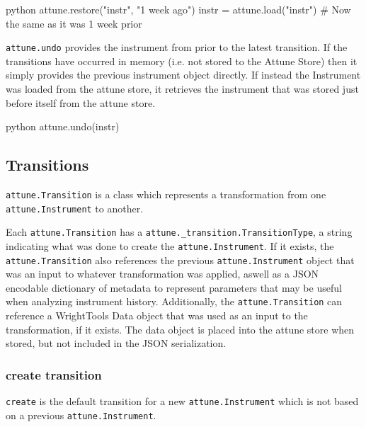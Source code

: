 \begin{codefragment}{python}
attune.restore("instr", "1 week ago")
instr = attune.load("instr")  # Now the same as it was 1 week prior
\end{codefragment}

\hypertarget{undo}{%
\label{undo}}

\texttt{attune.undo} provides the instrument from prior to the latest
transition. If the transitions have occurred in memory (i.e. not stored
to the Attune Store) then it simply provides the previous instrument
object directly. If instead the Instrument was loaded from the attune
store, it retrieves the instrument that was stored just before itself
from the attune store.

\begin{codefragment}{python}
attune.undo(instr)
\end{codefragment}


\hypertarget{transitions}{%
\subsection{Transitions}\label{transitions}}

\texttt{attune.Transition} is a class which represents
a transformation from one \texttt{attune.Instrument} to
another.

Each \texttt{attune.Transition} has a
\texttt{attune.\_transition.TransitionType}, a string
indicating what was done to create the
\texttt{attune.Instrument}. If it exists, the
\texttt{attune.Transition} also references the previous
\texttt{attune.Instrument} object that was an input to
whatever transformation was applied, aswell as a JSON encodable
dictionary of metadata to represent parameters that may be useful when
analyzing instrument history. Additionally, the
\texttt{attune.Transition} can reference a WrightTools
Data object that was used as an input to the transformation, if it
exists. The data object is placed into the attune store when stored, but
not included in the JSON serialization.

\hypertarget{create-transition}{%
\subsubsection{create transition}\label{create-transition}}

\texttt{create} is the default transition for a new
\texttt{attune.Instrument} which is not based on a
previous \texttt{attune.Instrument}.

